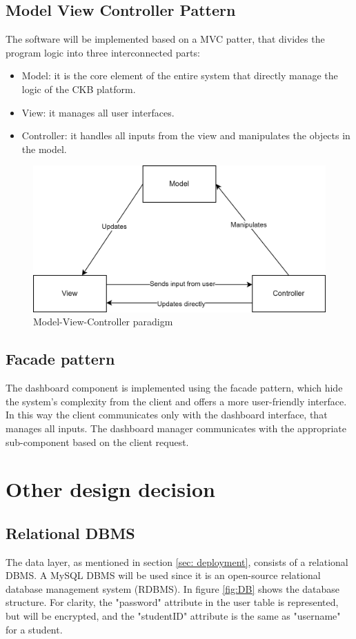 \subsection*{Model View Controller Pattern}
The software will be implemented based on a MVC patter, that divides the program logic into three interconnected parts:
\begin{itemize}
    \item Model: it is the core element of the entire system that directly manage the logic of the CKB platform. 
    \item View: it manages all user interfaces.
    \item Controller: it handles all inputs from the view and manipulates the objects in the model.
\end{itemize}
\begin{figure}[h]
    \centering 
    \includegraphics[scale=0.8]{images/MVC.png}
    \caption{Model-View-Controller paradigm}
    \label{fig:MVC}
\end{figure}

\subsection*{Facade pattern}
The dashboard component is implemented using the facade pattern, which hide the system's complexity from the client and offers a more user-friendly interface.
In this way the client communicates only with the dashboard interface, that manages all inputs. The dashboard manager communicates with the appropriate sub-component based on the client request.

\clearpage
\section{Other design decision}
\subsection*{Relational DBMS}
The data layer, as mentioned in section \ref{sec: deployment}, consists of a relational DBMS. A MySQL DBMS will be used since it is an open-source relational database management system (RDBMS). \newline
In figure \ref{fig:DB} shows the database structure. \newline
For clarity, the "password" attribute in the user table is represented, but will be encrypted, and the "studentID" attribute is the same as "username" for a student. 

